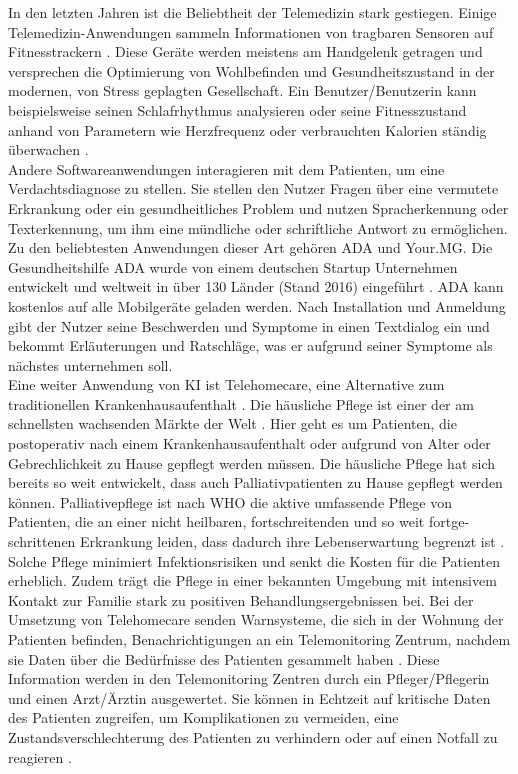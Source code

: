 In den letzten Jahren ist die Beliebtheit der Telemedizin stark gestiegen. Einige Telemedizin-Anwendungen sammeln Informationen von tragbaren Sensoren auf Fitnesstrackern \cite{Opportunities_challenges_ai_hc}. Diese Geräte werden meistens am Handgelenk getragen und versprechen die Optimierung von Wohlbefinden und Gesundheitszustand in der modernen, von Stress geplagten Gesellschaft. Ein Benutzer/Benutzerin kann beispielsweise seinen Schlafrhythmus analysieren oder seine Fitnesszustand anhand von Parametern wie Herzfrequenz oder verbrauchten Kalorien ständig überwachen \cite{Opportunities_challenges_ai_hc}. \\
Andere Softwareanwendungen interagieren mit dem Patienten, um eine Verdachtsdiagnose zu stellen\cite{Opportunities_challenges_ai_hc}. Sie stellen den Nutzer Fragen über eine vermutete Erkrankung oder ein gesundheitliches Problem und nutzen Spracherkennung oder Texterkennung, um ihm eine mündliche oder schriftliche Antwort zu ermöglichen.
Zu den beliebtesten Anwendungen dieser Art gehören ADA und Your.MG. Die Gesundheitshilfe ADA wurde von einem deutschen Startup Unternehmen entwickelt und weltweit in über 130 Länder (Stand 2016) eingeführt \cite{Opportunities_challenges_ai_hc}. ADA kann kostenlos auf alle Mobilgeräte geladen werden. Nach Installation und Anmeldung gibt der Nutzer seine Beschwerden und Symptome in einen Textdialog ein und bekommt Erläuterungen und Ratschläge, was er aufgrund seiner Symptome als nächstes unternehmen soll.\\
Eine weiter Anwendung von KI ist Telehomecare, eine Alternative zum traditionellen Krankenhausaufenthalt \cite{Chapter_14}. Die häusliche Pflege ist einer der am schnellsten wachsenden Märkte der Welt \cite{Chapter_14}. Hier geht es um Patienten, die postoperativ nach einem Krankenhausaufenthalt oder aufgrund von Alter oder Gebrechlichkeit zu Hause gepflegt werden müssen. Die häusliche Pflege hat sich bereits so weit entwickelt, dass auch Palliativpatienten zu Hause gepflegt werden können. Palliativepflege ist nach WHO die aktive um­fassen­de Pflege von Patienten, die an ei­ner nicht heil­baren, fort­schreiten­den und so weit fort­ge­schritte­nen Erkrankung leiden, dass dadurch ih­re Le­bens­er­wartung be­grenzt ist \cite{Pschyrembel}. Solche Pflege minimiert Infektionsrisiken und senkt die Kosten für die Patienten erheblich. Zudem trägt die Pflege in einer bekannten Umgebung mit intensivem Kontakt zur Familie stark zu positiven Behandlungsergebnissen bei.
Bei der Umsetzung von Telehomecare senden Warnsysteme, die sich in der Wohnung der Patienten befinden, Benachrichtigungen an ein Telemonitoring Zentrum, nachdem sie Daten über die Bedürfnisse des Patienten gesammelt haben \cite{Chapter_14}. Diese Information werden in den Telemonitoring Zentren durch ein Pfleger/Pflegerin und einen Arzt/Ärztin ausgewertet. Sie können in Echtzeit auf kritische Daten des Patienten zugreifen, um Komplikationen zu vermeiden, eine Zustandsverschlechterung des Patienten zu verhindern oder auf einen Notfall zu reagieren \cite{Chapter_14}.\\
